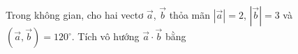 \begin{ex}
Trong không gian, cho hai vectơ $\vec a$, $\vec b$ thỏa mãn $|\vec a|=2$, $|\vec b|=3$ và $\left(\vec a,\vec b\right)=120^\circ$. Tích vô hướng $\vec a\cdot\vec b$ bằng
\end{ex}
